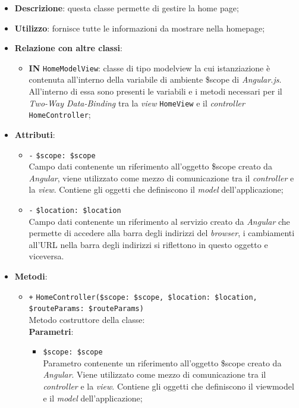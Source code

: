\begin{itemize}
	\item \textbf{Descrizione}: questa classe permette di gestire la home page;
	\item \textbf{Utilizzo}: fornisce tutte le informazioni da mostrare nella homepage;
	\item \textbf{Relazione con altre classi}:
	\begin{itemize}
		\item \textbf{IN} \texttt{HomeModelView}: classe di tipo modelview la cui istanziazione è contenuta all'interno della variabile di ambiente \$scope di \textit{Angular.js}. All'interno di essa sono presenti le variabili e i metodi necessari per il \textit{Two-Way Data-Binding} tra la \textit{view} \texttt{HomeView} e il \textit{controller} \texttt{HomeController};
	\end{itemize}
	\item \textbf{Attributi}:
	\begin{itemize}
		\item \texttt{-} \texttt{\$scope: \$scope} \\
		Campo dati contenente un riferimento all'oggetto \$scope creato da \textit{Angular}, viene utilizzato come mezzo di comunicazione tra il \textit{controller} e la \textit{view}. Contiene gli oggetti che definiscono il \textit{model} dell'applicazione;
		\item \texttt{-} \texttt{\$location: \$location} \\
		Campo dati contenente un riferimento al servizio creato da \textit{Angular} che permette di accedere alla barra degli indirizzi del \textit{browser}, i cambiamenti all'URL nella barra degli indirizzi si riflettono in questo oggetto e viceversa.
	\end{itemize}
	\item \textbf{Metodi}:
	\begin{itemize}
		\item \texttt{+} \texttt{HomeController(\$scope: \$scope, \$location: \$location, \$routeParams: \$routeParams)} \\
		Metodo costruttore della classe: \\
		\textbf{Parametri}:
		\begin{itemize}
			\item \texttt{\$scope: \$scope} \\
			Parametro contenente un riferimento all'oggetto \$scope creato da \textit{Angular}. Viene utilizzato come mezzo di comunicazione tra il \textit{controller} e la \textit{view}. Contiene gli oggetti che definiscono il viewmodel e il \textit{model} dell'applicazione;

\end{itemize}
\end{itemize}
\end{itemize}
